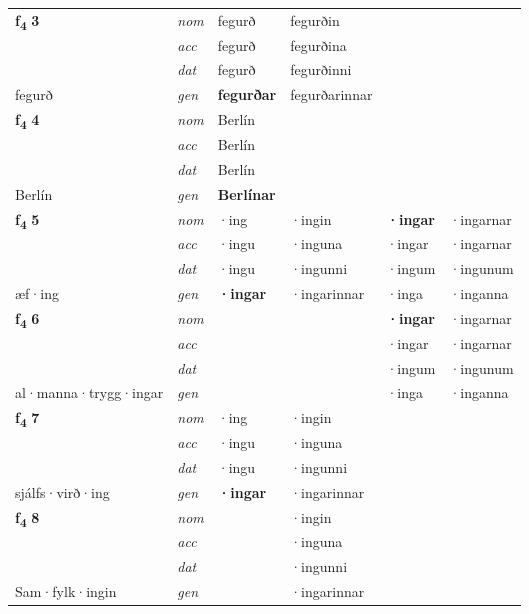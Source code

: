 \begin{longtable}[l]{X>{\footnotesize\itshape}XXXXX}
\multirow{3}{*}{{{\textbf{f{\textsubscript{4}}} \Large{\textbf{3}}}}} & nom & fegurð & fegurðin & \textbf{} &  \\*
 & acc & fegurð & fegurðina &  &  \\*
 & dat & fegurð & fegurðinni &  &  \\*
 {\footnotesize{fegurð}} & gen & \textbf{fegurðar} & fegurðarinnar &  &  \\
\midrule

\multirow{3}{*}{{{\textbf{f{\textsubscript{4}}} \Large{\textbf{4}}}}} & nom & Berlín &  & \textbf{} &  \\*
 & acc & Berlín &  &  &  \\*
 & dat & Berlín &  &  &  \\*
 {\footnotesize{Berlín}} & gen & \textbf{Berlínar} &  &  &  \\
\midrule

\multirow{3}{*}{{{\textbf{f{\textsubscript{4}}} \Large{\textbf{5}}}}} & nom & ·ing & ·ingin & \textbf{·ingar} & ·ingarnar \\*
 & acc & ·ingu & ·inguna & ·ingar & ·ingarnar \\*
 & dat & ·ingu & ·ingunni & ·ingum & ·ingunum \\*
 {\footnotesize{æf\allowbreak ·ing}} & gen & \textbf{·ingar} & ·ingarinnar & ·inga & ·inganna \\
\midrule

\multirow{3}{*}{{{\textbf{f{\textsubscript{4}}} \Large{\textbf{6}}}}} & nom &  &  & \textbf{·ingar} & ·ingarnar \\*
 & acc &  &  & ·ingar & ·ingarnar \\*
 & dat &  &  & ·ingum & ·ingunum \\*
 {\footnotesize{al\allowbreak ·manna\allowbreak ·trygg\allowbreak ·ingar}} & gen & \textbf{} &  & ·inga & ·inganna \\
\midrule

\multirow{3}{*}{{{\textbf{f{\textsubscript{4}}} \Large{\textbf{7}}}}} & nom & ·ing & ·ingin & \textbf{} &  \\*
 & acc & ·ingu & ·inguna &  &  \\*
 & dat & ·ingu & ·ingunni &  &  \\*
 {\footnotesize{sjálfs\allowbreak ·virð\allowbreak ·ing}} & gen & \textbf{·ingar} & ·ingarinnar &  &  \\
\midrule

\multirow{3}{*}{{{\textbf{f{\textsubscript{4}}} \Large{\textbf{8}}}}} & nom &  & ·ingin & \textbf{} &  \\*
 & acc &  & ·inguna &  &  \\*
 & dat &  & ·ingunni &  &  \\*
 {\footnotesize{Sam\allowbreak ·fylk\allowbreak ·ingin}} & gen & \textbf{} & ·ingarinnar &  &  \\
\midrule


\end{longtable}

